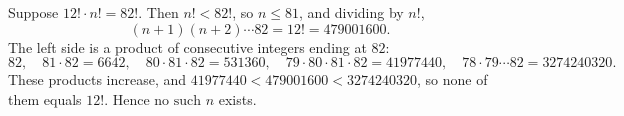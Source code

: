 Suppose $12!\cdot n!=82!$. Then $n!<82!$, so $n\le81$, and dividing by $n!$,
\[
(n+1)(n+2)\cdots82=12!=479001600 .
\]
The left side is a product of consecutive integers ending at $82$:
\[
82,\quad 81\cdot82=6642,\quad 80\cdot81\cdot82=531360,\quad 79\cdot80\cdot81\cdot82=41977440,\quad 78\cdot79\cdots82=3274240320 .
\]
These products increase, and $41977440<479001600<3274240320$, so none of them equals $12!$. Hence $\boxed{\text{no such }n}$ exists.
